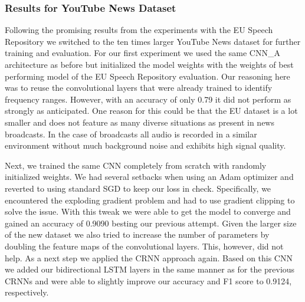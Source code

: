 \subsubsection{Results for YouTube News Dataset}
\label{sec:results_news}
Following the promising results from the experiments with the EU Speech Repository we switched to the ten times larger YouTube News dataset for further training and evaluation.
For our first experiment we used the same CNN\_A architecture as before but initialized the model weights with the weights of best performing model of the EU Speech Repository evaluation. Our reasoning here was to reuse the convolutional layers that were already trained to identify frequency ranges. However, with an accuracy of only 0.79 it did not perform as strongly as anticipated. One reason for this could be that the EU dataset is a lot smaller and does not feature as many diverse situations as present in news broadcasts. In the case of broadcasts all audio is recorded in a similar environment without much background noise and exhibits high signal quality.

Next, we trained the same CNN completely from scratch with randomly initialized weights. We had several setbacks when using an Adam optimizer and reverted to using standard SGD to keep our loss in check. Specifically, we encountered the exploding gradient problem\cite[ch. 8.2.4, p. 288]{Goodfellow-et-al-2016} and had to use gradient clipping to solve the issue. With this tweak we were able to get the model to converge and gained an accuracy of 0.9090 besting our previous attempt. 
Given the larger size of the new dataset we also tried to increase the number of parameters by doubling the feature maps of the convolutional layers. This, however, did not help.
As a next step we applied the CRNN approach again. Based on this CNN we added our bidirectional LSTM layers in the same manner as for the previous CRNNs and were able to slightly improve our accuracy and F1 score to 0.9124, respectively. 

